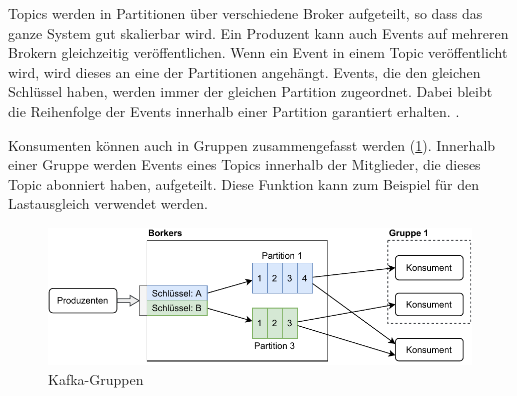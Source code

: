 Topics werden in Partitionen über verschiedene Broker aufgeteilt, so dass das ganze System gut skalierbar wird.
Ein Produzent kann auch Events auf mehreren Brokern gleichzeitig veröffentlichen.
Wenn ein Event in einem Topic veröffentlicht wird, wird dieses an eine der Partitionen angehängt.
Events, die den gleichen Schlüssel haben, werden immer der gleichen Partition zugeordnet.
Dabei bleibt die Reihenfolge der Events innerhalb einer Partition garantiert erhalten. \parencite{kafka-docs}.

Konsumenten können auch in Gruppen zusammengefasst werden (\cref{fig:kafka-gruppen}).
Innerhalb einer Gruppe werden Events eines Topics innerhalb der Mitglieder, die dieses Topic abonniert haben, aufgeteilt.
Diese Funktion kann zum Beispiel für den Lastausgleich verwendet werden.

\begin{figure}
    \centering
    \includegraphics{Grafiken/Grundlagen/Kafka-Gruppen.pdf}
    \caption{Kafka-Gruppen}
    \label{fig:kafka-gruppen}
\end{figure}